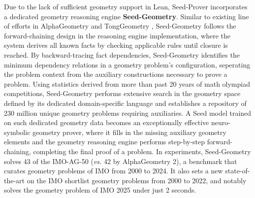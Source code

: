 Due to the lack of sufficient geometry support in Lean, Seed-Prover incorporates a dedicated geometry reasoning engine \textbf{Seed-Geometry}. Similar to existing line of efforts in AlphaGeometry \cite{trinh2024solving,chervonyi2025gold} and TongGeometry \cite{zhang2024proposing}, Seed-Geometry follows the forward-chaining design in the reasoning engine implementation, where the system derives all known facts by checking applicable rules until closure is reached. By backward-tracing fact dependencies, Seed-Geometry identifies the minimum dependency relations in a geometry problem's configuration, seperating the problem context from the auxiliary constructions necessary to prove a problem. Using statistics derived from more than past 20 years of math olympiad competitions, Seed-Geometry performs extensive search in the geometry space defined by its dedicated domain-specific language and establishes a repository of 230 million unique geometry problems requiring auxiliaries. A Seed model trained on such dedicated geometry data becomes an exceptionally effective neuro-symbolic geometry prover, where it fills in the missing auxiliary geometry elements and the geometry reasoning engine performs step-by-step forward-chaining, completing the final proof of a problem. In experiments, Seed-Geometry solves 43 of the IMO-AG-50 (\textit{vs.} 42 by AlphaGeometry 2), a benchmark that curates geometry problems of IMO from 2000 to 2024. It also sets a new state-of-the-art on the IMO shortlist geometry problems from 2000 to 2022, and notably solves the geometry problem of IMO 2025 under just 2 seconds.